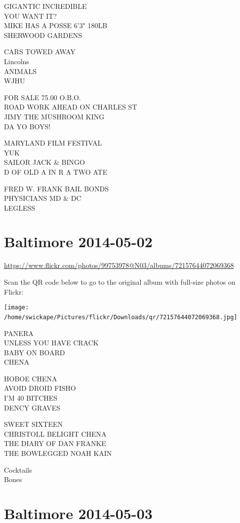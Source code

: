 \documentclass[10pt,letterpaper]{article}
\begin{document}
GIGANTIC INCREDIBLE\\
YOU WANT IT?\\
MIKE HAS A POSSE 6'3" 180LB\\
SHERWOOD GARDENS

CARS TOWED AWAY\\
Lincolns\\
ANIMALS\\
WJHU

FOR SALE 75.00 O.B.O.\\
ROAD WORK AHEAD ON CHARLES ST\\
JIMY THE MUSHROOM KING\\
DA YO BOYS!

MARYLAND FILM FESTIVAL\\
YUK\\
SAILOR JACK \& BINGO\\
D OF OLD A IN R A TWO ATE

FRED W. FRANK BAIL BONDS\\
PHYSICIANS MD \& DC\\
LEGLESS
\

\section*{Baltimore 2014-05-02}

\url{https://www.flickr.com/photos/99753978@N03/albums/72157644072069368}

Scan the QR code below to go to the original album with full-size photos on Flickr:

\texttt{[image: /home/swickape/Pictures/flickr/Downloads/qr/72157644072069368.jpg]}
\

PANERA\\
UNLESS YOU HAVE CRACK\\
BABY ON BOARD\\
CHENA

HOBOE CHENA\\
AVOID DROID FISHO\\
I'M 40 BITCHES\\
DENCY GRAVES

SWEET SIXTEEN\\
CHRISTOLL BELIGHT CHENA\\
THE DIARY OF DAN FRANKE\\
THE BOWLEGGED NOAH KAIN

Cocktails\\
Bones
\

\section*{Baltimore 2014-05-03}
\end{document}
